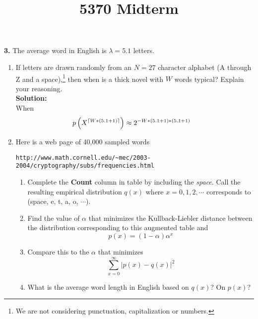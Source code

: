 \documentclass{assignment}
\begin{document}
\title{5370 Midterm}


\textbf{3.}
\label{SquishyBear}
The average word in English is $\lambda =5.1$ letters.
\begin{enumerate}
\item  If letters are drawn randomly from an $N=27$ character alphabet (A through Z and a space),\footnote{
    We are not considering punctuation, capitalization or numbers.
  }
  then when is a thick novel with $W$ words typical? Explain your reasoning. \\

  \textbf{Solution:} \\
  When
  \begin{align*}
    p\left(X^{\left \lceil W*(5.1 + 1) \right \rceil}\right) & \approx 2^{-W*(5.1 + 1)*(5.1 + 1)}
  \end{align*}
\item Here is a web page of 40,000 sampled words
  \begin{center}
    \verb"http://www.math.cornell.edu/~mec/2003-2004/cryptography/subs/frequencies.html"
  \end{center}
  \begin{enumerate}
  \item Complete the {\bf Count} column in table by including the {\em space}. Call the resulting empirical distribution $q(x)$ where $x=0,1,2,\cdots$ corresponds to (space, e, t, a, o, $\cdots$).
  \item Find the value of $\alpha$ that minimizes the Kullback-Liebler distance between the distribution corresponding to this augmented table and
    $$p(x) = (1-\alpha) \alpha^x $$
  \item Compare this to the $\alpha$ that minimizes
    $$ \sum_{x=0}^\infty \left| p(x) -  q(x) \right|^2 $$
  \item What is the average word length in English based on $q(x)$? On $p(x)$?
  \end{enumerate}
\end{enumerate}
\end{document}
